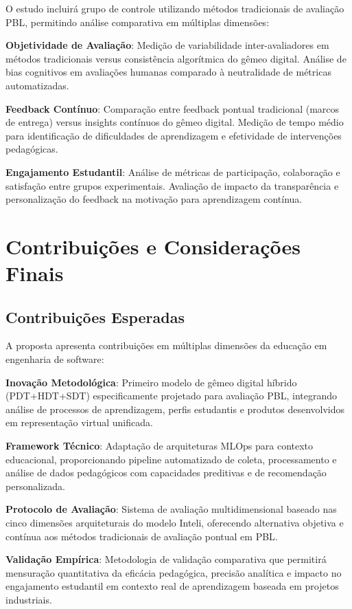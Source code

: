 \documentclass[english, spanish, brazilian]{RBIEarticle} %
\begin{document}
O estudo incluirá grupo de controle utilizando métodos tradicionais de
avaliação PBL, permitindo análise comparativa em múltiplas dimensões:

\textbf{Objetividade de Avaliação}: Medição de variabilidade inter-avaliadores em métodos tradicionais versus consistência algorítmica do gêmeo digital. Análise de bias cognitivos em avaliações humanas comparado à neutralidade de métricas automatizadas.

\textbf{Feedback Contínuo}: Comparação entre feedback pontual tradicional (marcos de entrega) versus insights contínuos do gêmeo digital. Medição de tempo médio para identificação de dificuldades de aprendizagem e efetividade de intervenções pedagógicas.

\textbf{Engajamento Estudantil}: Análise de métricas de participação, colaboração e satisfação entre grupos experimentais. Avaliação de impacto da transparência e personalização do feedback na motivação para aprendizagem contínua.

\section{Contribuições e Considerações Finais}

\subsection{Contribuições Esperadas}

A proposta apresenta contribuições em múltiplas dimensões da educação em
engenharia de software:

\textbf{Inovação Metodológica}: Primeiro modelo de gêmeo digital híbrido (PDT+HDT+SDT) especificamente projetado para avaliação PBL, integrando análise de processos de aprendizagem, perfis estudantis e produtos desenvolvidos em representação virtual unificada.

\textbf{Framework Técnico}: Adaptação de arquiteturas MLOps para contexto educacional, proporcionando pipeline automatizado de coleta, processamento e análise de dados pedagógicos com capacidades preditivas e de recomendação personalizada.

\textbf{Protocolo de Avaliação}: Sistema de avaliação multidimensional baseado nas cinco dimensões arquiteturais do modelo Inteli, oferecendo alternativa objetiva e contínua aos métodos tradicionais de avaliação pontual em PBL.

\textbf{Validação Empírica}: Metodologia de validação comparativa que permitirá mensuração quantitativa da eficácia pedagógica, precisão analítica e impacto no engajamento estudantil em contexto real de aprendizagem baseada em projetos industriais.
\end{document}
